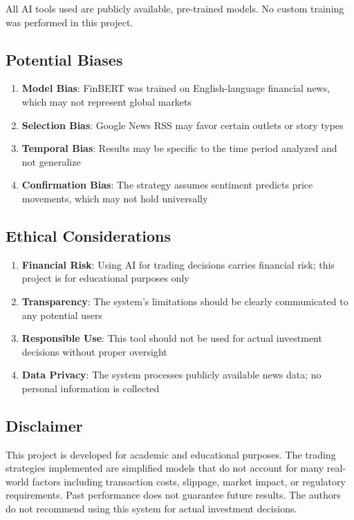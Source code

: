 \documentclass[12pt]{article}
\begin{document}
All AI tools used are publicly available, pre-trained models. No custom training was performed in this project.

\subsection{Potential Biases}

\begin{enumerate}
\item \textbf{Model Bias}: FinBERT was trained on English-language financial news, which may not represent global markets
\item \textbf{Selection Bias}: Google News RSS may favor certain outlets or story types
\item \textbf{Temporal Bias}: Results may be specific to the time period analyzed and not generalize
\item \textbf{Confirmation Bias}: The strategy assumes sentiment predicts price movements, which may not hold universally
\end{enumerate}

\subsection{Ethical Considerations}

\begin{enumerate}
\item \textbf{Financial Risk}: Using AI for trading decisions carries financial risk; this project is for educational purposes only
\item \textbf{Transparency}: The system's limitations should be clearly communicated to any potential users
\item \textbf{Responsible Use}: This tool should not be used for actual investment decisions without proper oversight
\item \textbf{Data Privacy}: The system processes publicly available news data; no personal information is collected
\end{enumerate}

\subsection{Disclaimer}

This project is developed for academic and educational purposes. The trading strategies implemented are simplified models that do not account for many real-world factors including transaction costs, slippage, market impact, or regulatory requirements. Past performance does not guarantee future results. The authors do not recommend using this system for actual investment decisions.
\end{document}
